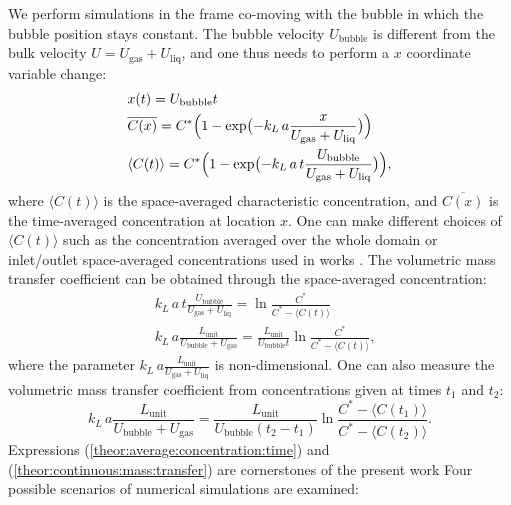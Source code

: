 \documentclass{article}
\newcommand{\beq}{\begin{equation}}
\newcommand{\feq}{\end{equation}}
\newcommand{\beqal}{\begin{equation}\begin{aligned}}
\newcommand{\feqal}{\end{aligned}\end{equation}}
\newcommand{\vol}{k_L\,a}
\newcommand{\lunit}{L_{\mathrm{unit}}}
\newcommand{\ububble}{U_{\mathrm{bubble}}}
\newcommand{\uliq}{U_{\mathrm{liq}}}
\newcommand{\ugas}{U_{\mathrm{gas}}}
\newcommand{\cstar}{C^{*}}
\newcommand{\volnondim}{\vol \frac{\lunit}{\ububble+\ugas}}
\begin{document}
We perform simulations in the frame co-moving with the bubble
in which the bubble position stays constant. The bubble velocity $\ububble$ is
different from the bulk velocity $U=\ugas+\uliq$, and one thus needs to perform a $x$ coordinate
variable change:
\beqal
\label{theor:average:concentration:time}
&x(t)=\ububble t\\
&\overline{C(x)}=\cstar \Bigl(1-\exp\bigl(-\vol \frac{x}{\ugas+\uliq}\bigr)\Bigr)\\
&\langle C(t)\rangle=\cstar \Bigl(1-\exp\bigl(-\vol\, t \frac{\ububble}{\ugas+\uliq}\bigr)\Bigr),
\feqal
where $\langle C(t)\rangle$ is the space-averaged characteristic concentration,
and $\overline{C(x)}$ is the time-averaged concentration at location $x$. 
One can make different choices of
$\langle C(t) \rangle$ such as the concentration averaged over the whole domain or inlet/outlet space-averaged
concentrations used in works \cite{vanbaten-circular,kreutzer-overview}.  
The volumetric mass transfer coefficient can be obtained through the space-averaged concentration:
\beqal
\label{theor:one:concentration:time}
&\vol\, t \frac{\ububble}{\ugas+\uliq}=\ln \frac{\cstar}{\cstar-\langle C(t)\rangle}\\
&\volnondim=\frac{\lunit}{\ububble t}\ln \frac{\cstar}{\cstar-\langle C(t) \rangle},
\feqal
where the parameter $\vol \frac{\lunit}{\ugas+\uliq}$ is non-dimensional. One can also measure the
volumetric mass transfer coefficient from concentrations given at times $t_1$ and $t_2$:
\beq
\label{theor:continuous:mass:transfer}
\volnondim=\frac{\lunit}{\ububble
(t_2-t_1)}\ln\frac{C^{*}-\langle C(t_1) \rangle}{C^{*}-\langle C(t_2) \rangle}.
\feq
Expressions (\ref{theor:average:concentration:time}) and (\ref{theor:continuous:mass:transfer}) are
cornerstones of the present work  Four possible scenarios of numerical simulations are examined: 
\end{document}
